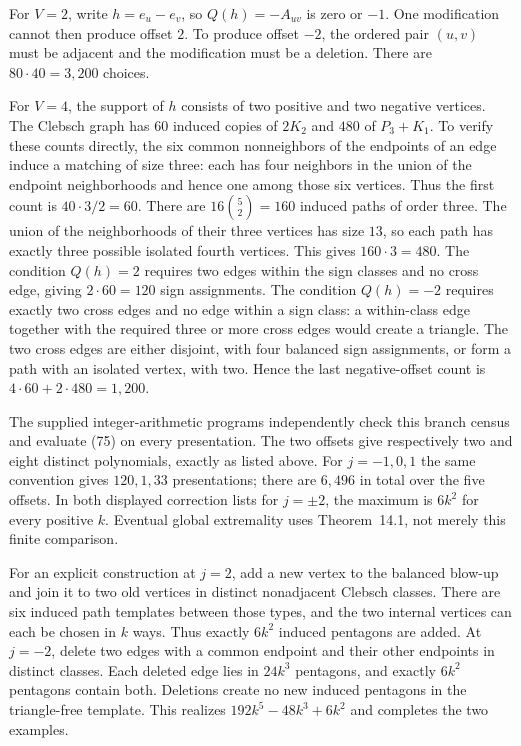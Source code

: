 For $V=2$, write $h=e_u-e_v$, so $Q(h)=-A_{uv}$ is zero or $-1$.
One modification cannot then produce offset $2$. To produce offset $-2$,
the ordered pair $(u,v)$ must be adjacent and the modification must be a
deletion. There are $80\cdot40=3,200$ choices.

For $V=4$, the support of $h$ consists of two positive and two negative
vertices. The Clebsch graph has $60$ induced copies of $2K_2$ and $480$
of $P_3+K_1$. To verify these counts directly, the six common nonneighbors
of the endpoints of an edge induce a matching of size three: each has
four neighbors in the union of the endpoint neighborhoods and hence one
among those six vertices. Thus the first count is $40\cdot3/2=60$.
There are $16\binom{5}{2}=160$ induced paths of order three. The union
of the neighborhoods of their three vertices has size $13$, so each path
has exactly three possible isolated fourth vertices. This gives
$160\cdot3=480$.
The condition $Q(h)=2$ requires two edges within the sign classes and no
cross edge, giving $2\cdot60=120$ sign assignments. The condition
$Q(h)=-2$ requires exactly two cross edges and no edge within a sign
class: a within-class edge together with the required three or more cross
edges would create a triangle. The two cross edges are either disjoint,
with four balanced sign assignments, or form a path with an isolated
vertex, with two. Hence the last negative-offset count is
$4\cdot60+2\cdot480=1,200$.

The supplied integer-arithmetic programs independently check this branch
census and evaluate (75) on every presentation. The two offsets give
respectively two and eight distinct polynomials, exactly as listed above.
For $j=-1,0,1$ the same convention gives $120,1,33$ presentations;
there are $6,496$ in total over the five offsets. In both displayed
correction lists for $j=\pm2$, the maximum is $6k^2$ for every positive
$k$. Eventual global extremality uses Theorem~14.1, not merely this finite
comparison.

For an explicit construction at $j=2$, add a new vertex to the balanced
blow-up and join it to two old vertices in distinct nonadjacent Clebsch
classes. There are six induced path templates between those types, and
the two internal vertices can each be chosen in $k$ ways. Thus exactly
$6k^2$ induced pentagons are added. At $j=-2$, delete two edges with a
common endpoint and their other endpoints in distinct classes. Each
deleted edge lies in $24k^3$ pentagons, and exactly $6k^2$ pentagons
contain both. Deletions create no new induced pentagons in the
triangle-free template. This realizes $192k^5-48k^3+6k^2$ and completes
the two examples.
